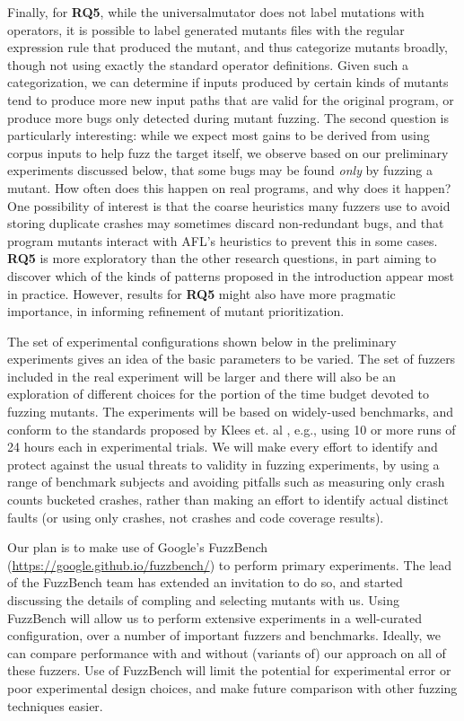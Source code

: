 Finally, for {\bf RQ5}, while the universalmutator does not label mutations with operators, it is possible to label generated mutants files with the regular expression rule that produced the mutant, and thus categorize mutants broadly, though not using exactly the standard operator definitions.  Given such a categorization, we can determine if inputs produced by certain kinds of mutants tend to produce more new input paths that are valid for the original program, or produce more bugs only detected during mutant fuzzing.  The second question is particularly interesting: while we expect most gains to be derived from using corpus
inputs to help fuzz the target itself, we observe based on our
preliminary experiments discussed below, that some bugs may be found
\emph{only} by fuzzing a mutant.  How often does this happen on real
programs, and why does it happen?  One possibility of interest is that the coarse heuristics many fuzzers use to avoid storing duplicate crashes \cite{semantic-crash-bucketing,mdebug} may sometimes discard non-redundant bugs, and that program mutants interact with AFL's heuristics to prevent this in some cases.  {\bf RQ5} is more exploratory than the other research questions, in part aiming to discover which of the kinds of patterns proposed in the introduction appear most in practice.  However, results for {\bf RQ5} might also have more pragmatic importance, in informing refinement of mutant prioritization.

The set of experimental configurations shown below in the preliminary experiments gives an idea of the basic parameters to be varied.  The set of fuzzers included in the real experiment will be larger and there will also be an exploration of different choices for the portion of the time budget devoted to fuzzing mutants.  The experiments will be based on widely-used benchmarks, and conform to the standards proposed by Klees et. al \cite{evalfuzz}, e.g., using 10 or
more runs of 24 hours each in experimental trials.  We will make every effort to identify and protect against the usual threats to validity in fuzzing experiments, by using a range of benchmark subjects and avoiding pitfalls such as measuring only crash counts bucketed crashes, rather than making an effort to identify actual distinct faults \cite{FuzzAppeal} (or using only crashes, not crashes and code coverage results).

Our plan is to make use of Google's FuzzBench \cite{metzman2021fuzzbench} (\url{https://google.github.io/fuzzbench/}) to perform primary experiments.  The lead of the FuzzBench team has extended an invitation to do so, and started discussing the details of compling and selecting mutants with us.  Using FuzzBench will allow us to perform extensive experiments in a well-curated configuration, over a number of important fuzzers and benchmarks.  Ideally, we can compare performance with and without (variants of) our approach on all of these fuzzers.  Use of FuzzBench will limit the potential for experimental error or poor experimental design choices, and make future comparison with other fuzzing techniques easier.

